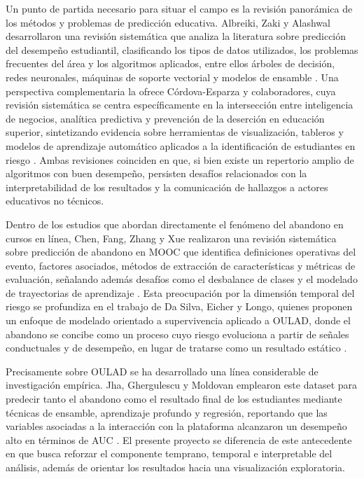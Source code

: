 Un punto de partida necesario para situar el campo es la revisión panorámica de los métodos y problemas de predicción educativa. Albreiki, Zaki y Alashwal desarrollaron una revisión sistemática que analiza la literatura sobre predicción del desempeño estudiantil, clasificando los tipos de datos utilizados, los problemas frecuentes del área y los algoritmos aplicados, entre ellos árboles de decisión, redes neuronales, máquinas de soporte vectorial y modelos de ensamble \cite{educsci11090552}. Una perspectiva complementaria la ofrece Córdova-Esparza y colaboradores, cuya revisión sistemática se centra específicamente en la intersección entre inteligencia de negocios, analítica predictiva y prevención de la deserción en educación superior, sintetizando evidencia sobre herramientas de visualización, tableros y modelos de aprendizaje automático aplicados a la identificación de estudiantes en riesgo \cite{info16040326}. Ambas revisiones coinciden en que, si bien existe un repertorio amplio de algoritmos con buen desempeño, persisten desafíos relacionados con la interpretabilidad de los resultados y la comunicación de hallazgos a actores educativos no técnicos.

Dentro de los estudios que abordan directamente el fenómeno del abandono en cursos en línea, Chen, Fang, Zhang y Xue realizaron una revisión sistemática sobre predicción de abandono en MOOC que identifica definiciones operativas del evento, factores asociados, métodos de extracción de características y métricas de evaluación, señalando además desafíos como el desbalance de clases y el modelado de trayectorias de aprendizaje \cite{1049482020222124425}. Esta preocupación por la dimensión temporal del riesgo se profundiza en el trabajo de Da Silva, Eicher y Longo, quienes proponen un enfoque de modelado orientado a supervivencia aplicado a OULAD, donde el abandono se concibe como un proceso cuyo riesgo evoluciona a partir de señales conductuales y de desempeño, en lugar de tratarse como un resultado estático \cite{arXiv260408870}.

Precisamente sobre OULAD se ha desarrollado una línea considerable de investigación empírica. Jha, Ghergulescu y Moldovan emplearon este dataset para predecir tanto el abandono como el resultado final de los estudiantes mediante técnicas de ensamble, aprendizaje profundo y regresión, reportando que las variables asociadas a la interacción con la plataforma alcanzaron un desempeño alto en términos de AUC \cite{0007767901540164}. El presente proyecto se diferencia de este antecedente en que busca reforzar el componente temprano, temporal e interpretable del análisis, además de orientar los resultados hacia una visualización exploratoria.

